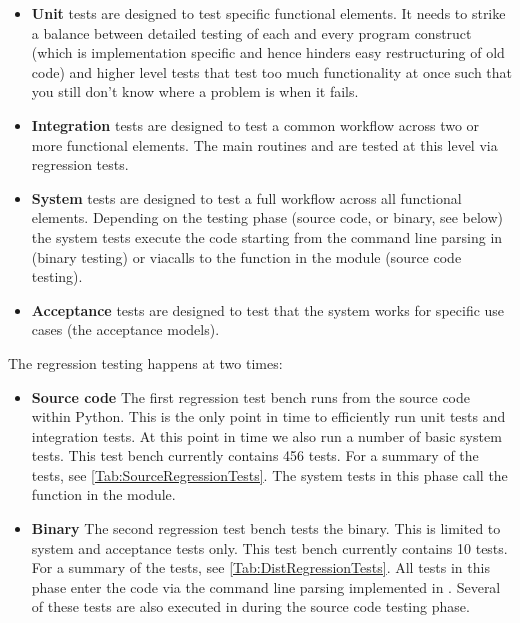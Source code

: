 \begin{itemize}
\item \textbf{Unit} tests are designed to test specific functional elements.
It needs to strike a balance between detailed testing of each and every program construct (which is implementation specific and hence hinders easy restructuring of old code) and higher level tests that test too much functionality at once such that you still don't know where a problem is when it fails.

\item \textbf{Integration} tests are designed to test a common workflow across two or more functional elements.
The main routines  and  are tested at this level via regression tests.

\item \textbf{System} tests are designed to test a full workflow across all functional elements.
Depending on the testing phase (source code, or binary, see below) the system tests execute the code starting from the command line parsing in  (binary testing) or viacalls to the  function in the  module (source code testing).

\item \textbf{Acceptance} tests are designed to test that the system works for specific use cases (the acceptance models).
\end{itemize}

The regression testing happens at two times:

\begin{itemize}
\item \textbf{Source code} The first regression test bench runs from the source code within Python.
This is the only point in time to efficiently run unit tests and integration tests.
At this point in time we also run a number of basic system tests.
This test bench currently contains 456 tests.
For a summary of the tests, see \autoref{Tab:SourceRegressionTests}.
The system tests in this phase call the  function in the  module.

\item \textbf{Binary} The second regression test bench tests the binary.
This is limited to system and acceptance tests only.
This test bench currently contains 10 tests.
For a summary of the tests, see \autoref{Tab:DistRegressionTests}.
All tests in this phase enter the code via the command line parsing implemented in .
Several of these tests are also executed in during the source code testing phase.
\end{itemize}

